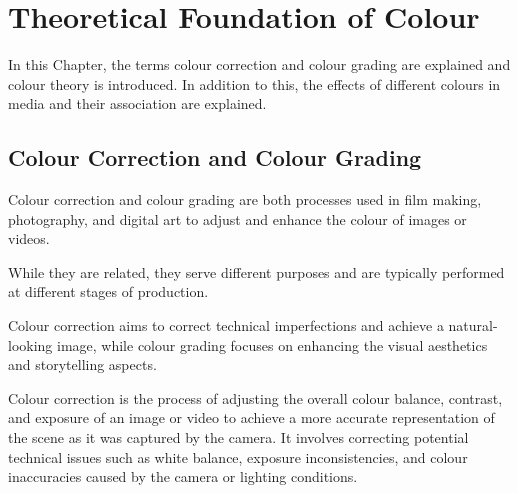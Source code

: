 \documentclass[../MasterThesis.tex]{subfiles}
\begin{document}
	

%
%
%
%
%
%
%
%
\newpage

\section{Theoretical Foundation of Colour} \label{subsection:theoreticalfoundationofcolour}

In this Chapter, the terms colour correction and colour grading are explained and colour theory is introduced. 
In addition to this, the effects of different colours in media and their association are explained.





\subsection{Colour Correction and Colour Grading} 


Colour correction and colour grading are both processes used in film making, photography, and digital art to adjust and enhance the colour of images or videos. 

While they are related, they serve different purposes and are typically performed at different stages of production.

Colour correction aims to correct technical imperfections and achieve a natural-looking image, while colour grading focuses on enhancing the visual aesthetics and storytelling aspects.~\cite{cc_cg_1, cc_cg_2}


Colour correction is the process of adjusting the overall colour balance, contrast, and exposure of an image or video to achieve a more accurate representation of the scene as it was captured by the camera. It involves correcting potential technical issues such as white balance, exposure inconsistencies, and colour inaccuracies caused by the camera or lighting conditions.~\cite{cc1, cc_cg_1, cc_cg_2}
\end{document}
